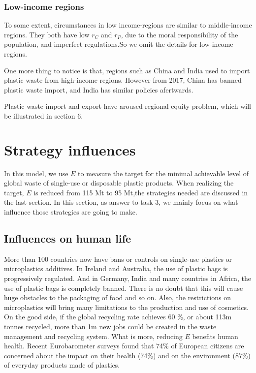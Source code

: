 \documentclass{mcmthesis}
\begin{document}
 \subsubsection{Low-income regions}
	 To some extent, circumstances in low income-regions are similar to middle-income regions. They both have low $r_C$ and $r_P$, due to the moral responsibility of the population, and imperfect regulations.So we omit the details for low-income regions. \par 
	 One more thing to notice is that, regions such as China and India used to import plastic waste from high-income regions. However from 2017, China has banned plastic waste import, and India has similar policies afertwards. 

	 Plastic waste import and export have aroused regional equity problem, which will be illustrated in section 6.

	

	 \section{Strategy influences}
	 In this model, we use $E$ to measure the target for the minimal achievable level of global waste of single-use or disposable plastic products. When realizing the target, $E$ is reduced from 115 Mt to 95 Mt,the strategies needed are discussed in the last section. 
	 In this section, as answer to task 3, we mainly focus on what influence those strategies are going to make.
	  \subsection{Influences on human life}
		  More than 100 countries now have bans or controls on single-use plastics or microplastics additives.\cite{EUReport}
		 In Ireland and Australia, the use of plastic bags is progressively regulated. And in Germany, India and many countries in Africa, the use of plastic bags is completely banned\cite{xanthos2017international}. There is no doubt that this will cause huge obstacles to the packaging of food and so on. Also, the restrictions on microplastics will bring many limitations to the production and use of cosmetics.
		 On the good side, if the global recycling rate  achieves  60 \%, or about 113m tonnes recycled, more than 1m new jobs could be created in the waste management and recycling system.\cite{WWFReport}
		 What is more, reducing $E$ benefits human health. Recent Eurobarometer surveys found that 74\% of European citizens are 
		 concerned about the impact on their health (74\%) and on the environment (87\%) of everyday 
		 products made of plastics.\cite{eu2018assesment}
\end{document}
